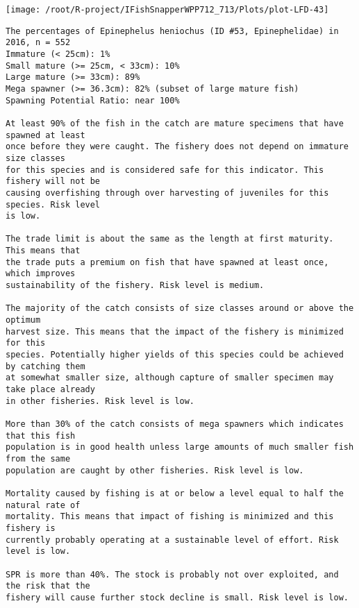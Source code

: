 \documentclass{report}\usepackage[]{graphicx}\usepackage[]{color}
\makeatletter
\def\maxwidth{ %
  \ifdim\Gin@nat@width>\linewidth
    \linewidth
  \else
    \Gin@nat@width
  \fi
}
\newenvironment{kframe}{%
 \def\at@end@of@kframe{}%
 \ifinner\ifhmode%
  \def\at@end@of@kframe{\end{minipage}}%
  \begin{minipage}{\columnwidth}%
 \fi\fi%
 \def\FrameCommand##1{\hskip\@totalleftmargin \hskip-\fboxsep
 \colorbox{shadecolor}{##1}\hskip-\fboxsep
     \hskip-\linewidth \hskip-\@totalleftmargin \hskip\columnwidth}%
 \MakeFramed {\advance\hsize-\width
   \@totalleftmargin\z@ \linewidth\hsize
   \@setminipage}}%
 {\par\unskip\endMakeFramed%
 \at@end@of@kframe}
\newenvironment{knitrout}{}{} %
\makeatother
\begin{document}
\begin{knitrout}
\texttt{[image: /root/R-project/IFishSnapperWPP712\_713/Plots/plot-LFD-43]} 
\begin{kframe}\begin{verbatim}
The percentages of Epinephelus heniochus (ID #53, Epinephelidae) in 2016, n = 552
Immature (< 25cm): 1%
Small mature (>= 25cm, < 33cm): 10%
Large mature (>= 33cm): 89%
Mega spawner (>= 36.3cm): 82% (subset of large mature fish)
Spawning Potential Ratio: near 100%
 
At least 90% of the fish in the catch are mature specimens that have spawned at least
once before they were caught. The fishery does not depend on immature size classes
for this species and is considered safe for this indicator. This fishery will not be
causing overfishing through over harvesting of juveniles for this species. Risk level
is low.

The trade limit is about the same as the length at first maturity.  This means that
the trade puts a premium on fish that have spawned at least once, which improves
sustainability of the fishery. Risk level is medium.

The majority of the catch consists of size classes around or above the optimum
harvest size. This means that the impact of the fishery is minimized for this
species. Potentially higher yields of this species could be achieved by catching them
at somewhat smaller size, although capture of smaller specimen may take place already
in other fisheries. Risk level is low.

More than 30% of the catch consists of mega spawners which indicates that this fish
population is in good health unless large amounts of much smaller fish from the same
population are caught by other fisheries. Risk level is low.
 
Mortality caused by fishing is at or below a level equal to half the natural rate of
mortality. This means that impact of fishing is minimized and this fishery is
currently probably operating at a sustainable level of effort. Risk level is low.
 
SPR is more than 40%. The stock is probably not over exploited, and the risk that the
fishery will cause further stock decline is small. Risk level is low.
 

\end{verbatim}
\end{kframe}
\end{knitrout}
\end{document}
